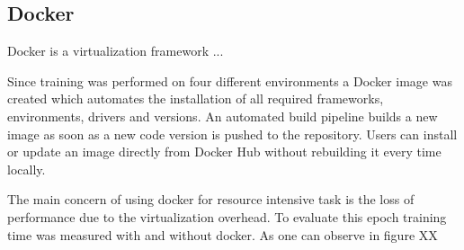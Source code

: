 \subsection{Docker}

Docker is a virtualization framework ...


Since training was performed on four different environments a Docker image was created which automates the installation of all required frameworks, environments, drivers and versions. An automated build pipeline builds a new image as soon as a new code version is pushed to the repository. Users can install or update an image directly from Docker Hub without rebuilding it every time locally.

The main concern of using docker for resource intensive task is the loss of performance due to the virtualization overhead. To evaluate this epoch training time was measured with and without docker. As one can observe in figure XX 



